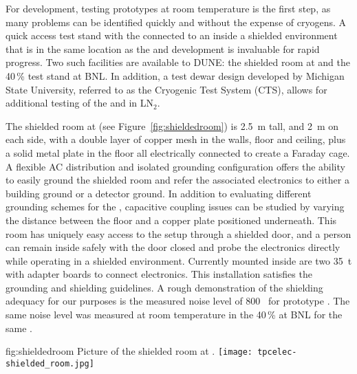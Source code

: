 For  development, testing prototypes at room temperature is the first step, as many problems can be identified quickly and without the expense of cryogens.  A quick access test stand with the  connected to an  inside a shielded environment that is in the same location as the  and  development is invaluable for rapid progress.  Two such facilities are available to DUNE: the shielded room at \fnal and the \num{40}\,\%  test stand at BNL.  In addition, a test dewar design developed by Michigan State University, referred to as the Cryogenic Test System (CTS), allows for additional testing of the  and  in LN$_2$.

The shielded room at \fnal (see Figure~\ref{fig:shieldedroom}) is \SI{2.5}{m} tall, and \SI{2}{m} on each side, with 
a double layer of copper mesh in the walls, floor and ceiling, plus a solid metal plate in the floor all electrically connected to create a Faraday cage.  A flexible AC distribution and isolated grounding configuration offers the ability to easily ground the shielded room and refer the associated electronics to either a building ground or a detector ground.  In addition
to evaluating different grounding schemes for the , capacitive coupling issues can be studied by varying the
distance between the floor and a copper plate positioned underneath.   
This room has uniquely easy access to the setup through a shielded door,
and a person can remain inside safely with the door closed and probe the electronics directly while operating
in a shielded environment.  Currently mounted inside are two \SI{35}{t}  
with adapter boards to connect  electronics.  This installation satisfies the  grounding and shielding guidelines.  A rough demonstration of the shielding adequacy for our purposes  is the measured noise level of 800~ for  prototype .  The same noise level was measured at room temperature in the \num{40}\,\%  at BNL for the same .

\begin{dunefigure}
{fig:shieldedroom}
{Picture of the shielded room at \fnal.}
\texttt{[image: tpcelec-shielded\_room.jpg]}
\end{dunefigure}

